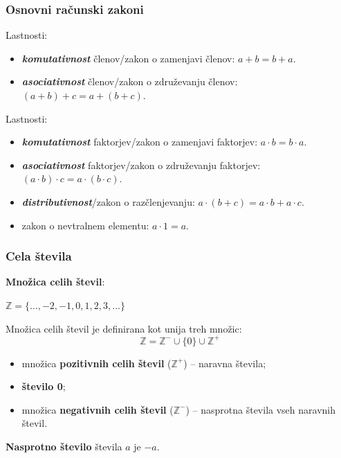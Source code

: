         \begin{frame}
            \frametitle{Osnovni računski zakoni}

            Lastnosti:
            \begin{itemize}
                \item \textit{\textbf{komutativnost}} členov/zakon o zamenjavi členov: $a+b = b+a$.
                \item \textit{\textbf{asociativnost}} členov/zakon o združevanju členov: $(a+b)+c = a+(b+c)$.
            \end{itemize}

        \end{frame}

        \begin{frame}

            Lastnosti:
            \begin{itemize}
                \item \textit{\textbf{komutativnost}} faktorjev/zakon o zamenjavi faktorjev: $a \cdot b = b \cdot a$.
                \item \textit{\textbf{asociativnost}} faktorjev/zakon o združevanju faktorjev: $(a \cdot b) \cdot c = a \cdot (b \cdot c)$.
                \item \textit{\textbf{distributivnost}}/zakon o razčlenjevanju: $a \cdot (b+c) = a \cdot b + a \cdot c$.
                \item zakon o nevtralnem elementu: $a \cdot 1 = a$.
            \end{itemize}

        \end{frame}

        \begin{frame}
            \frametitle{Cela števila}

            \textbf{Množica celih števil}: 
                \begin{alertblock}{}
                    \centering\boldmath
                    $\mathbb{Z} = \{\ldots, -2, -1, 0, 1, 2, 3, \ldots\}$
                \end{alertblock}

                Množica celih števil je definirana kot unija treh množic:
                $$\mathbb{Z} = \mathbb{Z}^- \cup \{0\} \cup \mathbb{Z}^+$$

                \begin{itemize}
                    \item množica \textbf{pozitivnih celih števil} ($\mathbb{Z}^+$) -- naravna števila;
                    \item \textbf{število 0};
                    \item množica \textbf{negativnih celih števil} ($\mathbb{Z}^-$) -- nasprotna števila vseh naravnih števil.
                \end{itemize}
                
                \medskip
                \textbf{Nasprotno število} števila $a$ je $-a$.
        \end{frame}

